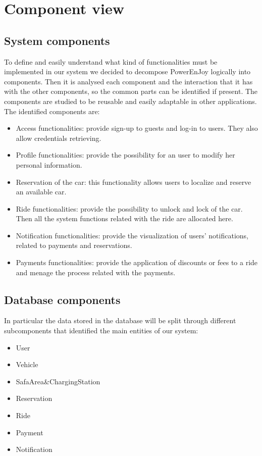  \section{Component view}
\subsection{System components}
To define and easily understand what kind of functionalities must be implemented in our system we decided to decompose PowerEnJoy logically into components. Then it is analysed each component and the interaction that it has with the other components, so the common parts can be identified if present. The components are studied to be reusable and easily adaptable in other applications.
\\The identified components are:
\begin{itemize}
	\item Access functionalities: provide sign-up to guests and log-in to users. They also allow credentials retrieving.
	\item Profile functionalities: provide the possibility for an user to modify her personal information.
	\item Reservation of the car: this functionality allows users to localize and reserve an available car.
	\item Ride functionalities: provide the possibility to unlock and lock of the car. Then all the system functions related with the ride are allocated here. %
	\item Notification functionalities: provide the visualization of users' notifications, related to payments and reservations.%
	\item Payments functionalities: provide the application of discounts or fees to a ride and menage the process related with the payments.
\end{itemize}

\subsection{Database components}
In particular the data stored in the database will be split through different subcomponents that identified the main entities of our system:
\begin{itemize}
	\item User  %
	\item Vehicle 
	\item SafaArea\&ChargingStation
	\item Reservation 
	\item Ride
	\item Payment  
	\item Notification 
\end{itemize} %

